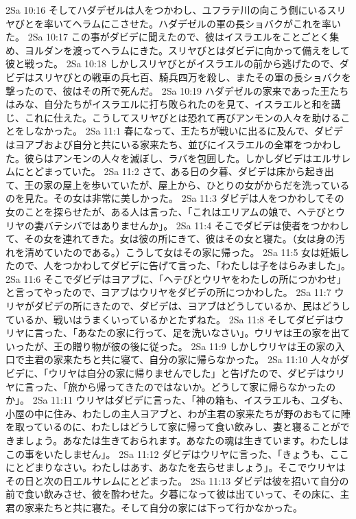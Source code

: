 2Sa 10:16  そしてハダデゼルは人をつかわし、ユフラテ川の向こう側にいるスリヤびとを率いてヘラムにこさせた。ハダデゼルの軍の長ショバクがこれを率いた。
2Sa 10:17  この事がダビデに聞えたので、彼はイスラエルをことごとく集め、ヨルダンを渡ってヘラムにきた。スリヤびとはダビデに向かって備えをして彼と戦った。
2Sa 10:18  しかしスリヤびとがイスラエルの前から逃げたので、ダビデはスリヤびとの戦車の兵七百、騎兵四万を殺し、またその軍の長ショバクを撃ったので、彼はその所で死んだ。
2Sa 10:19  ハダデゼルの家来であった王たちはみな、自分たちがイスラエルに打ち敗られたのを見て、イスラエルと和を講じ、これに仕えた。こうしてスリヤびとは恐れて再びアンモンの人々を助けることをしなかった。
2Sa 11:1  春になって、王たちが戦いに出るに及んで、ダビデはヨアブおよび自分と共にいる家来たち、並びにイスラエルの全軍をつかわした。彼らはアンモンの人々を滅ぼし、ラバを包囲した。しかしダビデはエルサレムにとどまっていた。
2Sa 11:2  さて、ある日の夕暮、ダビデは床から起き出て、王の家の屋上を歩いていたが、屋上から、ひとりの女がからだを洗っているのを見た。その女は非常に美しかった。
2Sa 11:3  ダビデは人をつかわしてその女のことを探らせたが、ある人は言った、「これはエリアムの娘で、ヘテびとウリヤの妻バテシバではありませんか」。
2Sa 11:4  そこでダビデは使者をつかわして、その女を連れてきた。女は彼の所にきて、彼はその女と寝た。（女は身の汚れを清めていたのである。）こうして女はその家に帰った。
2Sa 11:5  女は妊娠したので、人をつかわしてダビデに告げて言った、「わたしは子をはらみました」。
2Sa 11:6  そこでダビデはヨアブに、「ヘテびとウリヤをわたしの所につかわせ」と言ってやったので、ヨアブはウリヤをダビデの所につかわした。
2Sa 11:7  ウリヤがダビデの所にきたので、ダビデは、ヨアブはどうしているか、民はどうしているか、戦いはうまくいっているかとたずねた。
2Sa 11:8  そしてダビデはウリヤに言った、「あなたの家に行って、足を洗いなさい」。ウリヤは王の家を出ていったが、王の贈り物が彼の後に従った。
2Sa 11:9  しかしウリヤは王の家の入口で主君の家来たちと共に寝て、自分の家に帰らなかった。
2Sa 11:10  人々がダビデに、「ウリヤは自分の家に帰りませんでした」と告げたので、ダビデはウリヤに言った、「旅から帰ってきたのではないか。どうして家に帰らなかったのか」。
2Sa 11:11  ウリヤはダビデに言った、「神の箱も、イスラエルも、ユダも、小屋の中に住み、わたしの主人ヨアブと、わが主君の家来たちが野のおもてに陣を取っているのに、わたしはどうして家に帰って食い飲みし、妻と寝ることができましょう。あなたは生きておられます。あなたの魂は生きています。わたしはこの事をいたしません」。
2Sa 11:12  ダビデはウリヤに言った、「きょうも、ここにとどまりなさい。わたしはあす、あなたを去らせましょう」。そこでウリヤはその日と次の日エルサレムにとどまった。
2Sa 11:13  ダビデは彼を招いて自分の前で食い飲みさせ、彼を酔わせた。夕暮になって彼は出ていって、その床に、主君の家来たちと共に寝た。そして自分の家には下って行かなかった。
